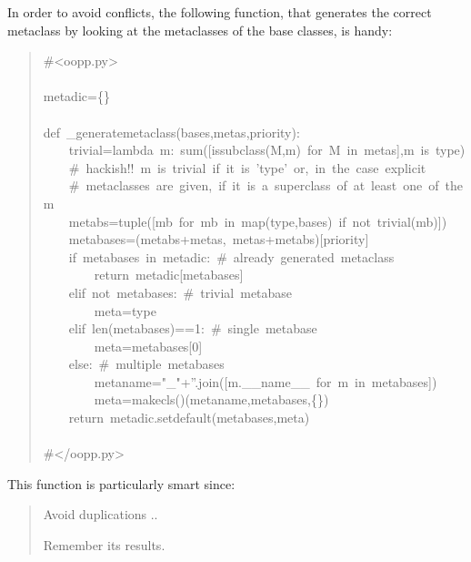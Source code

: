 \documentclass[10pt,english]{article}
\begin{document}
In order to avoid conflicts, the following function, that generates
the correct metaclass by looking at the metaclasses of the base
classes, is handy:
\begin{quote}
\begin{ttfamily}\begin{flushleft}
\mbox{{\#}<oopp.py>}\\
\mbox{}\\
\mbox{metadic={\{}{\}}}\\
\mbox{}\\
\mbox{def~{\_}generatemetaclass(bases,metas,priority):}\\
\mbox{~~~~trivial=lambda~m:~sum([issubclass(M,m)~for~M~in~metas],m~is~type)}\\
\mbox{~~~~{\#}~hackish!!~m~is~trivial~if~it~is~'type'~or,~in~the~case~explicit}\\
\mbox{~~~~{\#}~metaclasses~are~given,~if~it~is~a~superclass~of~at~least~one~of~them}\\
\mbox{~~~~metabs=tuple([mb~for~mb~in~map(type,bases)~if~not~trivial(mb)])}\\
\mbox{~~~~metabases=(metabs+metas,~metas+metabs)[priority]}\\
\mbox{~~~~if~metabases~in~metadic:~{\#}~already~generated~metaclass}\\
\mbox{~~~~~~~~return~metadic[metabases]}\\
\mbox{~~~~elif~not~metabases:~{\#}~trivial~metabase}\\
\mbox{~~~~~~~~meta=type~}\\
\mbox{~~~~elif~len(metabases)==1:~{\#}~single~metabase}\\
\mbox{~~~~~~~~meta=metabases[0]}\\
\mbox{~~~~else:~{\#}~multiple~metabases}\\
\mbox{~~~~~~~~metaname="{\_}"+''.join([m.{\_}{\_}name{\_}{\_}~for~m~in~metabases])}\\
\mbox{~~~~~~~~meta=makecls()(metaname,metabases,{\{}{\}})}\\
\mbox{~~~~return~metadic.setdefault(metabases,meta)}\\
\mbox{}\\
\mbox{{\#}</oopp.py>}
\end{flushleft}\end{ttfamily}
\end{quote}

This function is particularly smart since:
\begin{quote}
\begin{list}{.}
{
\setlength{\rightmargin}{\leftmargin}
}
\item {} 
Avoid duplications ..

\item {} 
Remember its results.

\end{list}
\end{quote}
\end{document}
